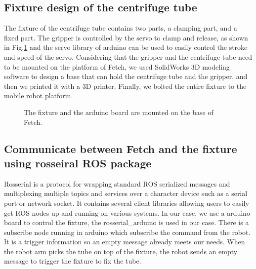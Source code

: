 \documentclass[12pt,draftclsnofoot,onecolumn]{IEEEtran}
\begin{document}
	
	\subsection{Fixture design of the centrifuge tube}
    The fixture of the centrifuge tube contains two parts, a clamping part, and a fixed part. The gripper is controlled by the servo to clamp and release, as shown in Fig.\ref{fixture} and the servo library of arduino can be used to easily control the stroke and speed of the servo. Considering that the gripper and the centrifuge tube need to be mounted on the platform of Fetch, we used SolidWorks 3D modeling software to design a base that can hold the centrifuge tube and the gripper, and then we printed it with a 3D printer. Finally, we bolted the entire fixture to the mobile robot platform.
	
	\begin{figure}[htbp]  %
    \centering
    \caption{The fixture and the arduino board are mounted on the base of Fetch.}
    \label{fixture}
    \end{figure}
	
	\subsection{Communicate between Fetch and the fixture using rosseiral ROS package}
	Rosserial is a protocol for wrapping standard ROS serialized messages and multiplexing multiple topics and services over a character device such as a serial port or network socket. It contains several client libraries allowing users to easily get ROS nodes up and running on various systems. In our case, we use a arduino board to control the fixture, the rosserial\_arduino is used in our case. There is a subscribe node running in arduino which subscribe the command from the robot. It is a trigger information so an empty message already meets our needs. When the robot arm picks the tube on top of the fixture, the robot sends an empty message to trigger the fixture to fix the tube.
	
\end{document}
